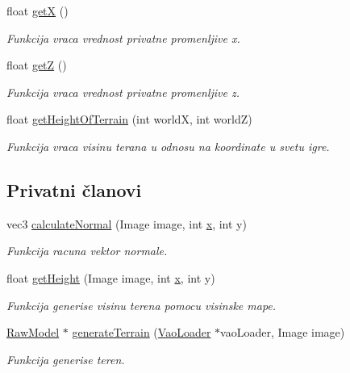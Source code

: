 \begin{DoxyCompactItemize}
float \hyperlink{classterrain_1_1Terrain_a7498906e811d059461be143d7323a6f9}{getX} ()
\begin{DoxyCompactList}\small\item\em Funkcija vraca vrednost privatne promenljive x. \end{DoxyCompactList}\item 
float \hyperlink{classterrain_1_1Terrain_ab348a1c250df237f2a60f59bf8797dc0}{getZ} ()
\begin{DoxyCompactList}\small\item\em Funkcija vraca vrednost privatne promenljive z. \end{DoxyCompactList}\item 
float \hyperlink{classterrain_1_1Terrain_afd074b9a18254b81abb89d29406f90e5}{get\+Height\+Of\+Terrain} (int worldX, int worldZ)
\begin{DoxyCompactList}\small\item\em Funkcija vraca visinu terana u odnosu na koordinate u svetu igre. \end{DoxyCompactList}\end{DoxyCompactItemize}
\subsection*{Privatni članovi}
\begin{DoxyCompactItemize}
\item 
vec3 \hyperlink{classterrain_1_1Terrain_a2864540ccf7224830c0bbf2961d207bb}{calculate\+Normal} (Image image, int \hyperlink{classterrain_1_1Terrain_aec56d6e8219539617090b8e99b89be29}{x}, int y)
\begin{DoxyCompactList}\small\item\em Funkcija racuna vektor normale. \end{DoxyCompactList}\item 
float \hyperlink{classterrain_1_1Terrain_a0707a64c79d89cfc358670651855cba1}{get\+Height} (Image image, int \hyperlink{classterrain_1_1Terrain_aec56d6e8219539617090b8e99b89be29}{x}, int y)
\begin{DoxyCompactList}\small\item\em Funkcija generise visinu terena pomocu visinske mape. \end{DoxyCompactList}\item 
\hyperlink{classmodel_1_1RawModel}{Raw\+Model} $\ast$ \hyperlink{classterrain_1_1Terrain_aadecc14ee7c1c340c54c6960d489f1da}{generate\+Terrain} (\hyperlink{classcore_1_1VaoLoader}{Vao\+Loader} $\ast$vao\+Loader, Image image)
\begin{DoxyCompactList}\small\item\em Funkcija generise teren. \end{DoxyCompactList}\end{DoxyCompactItemize}
